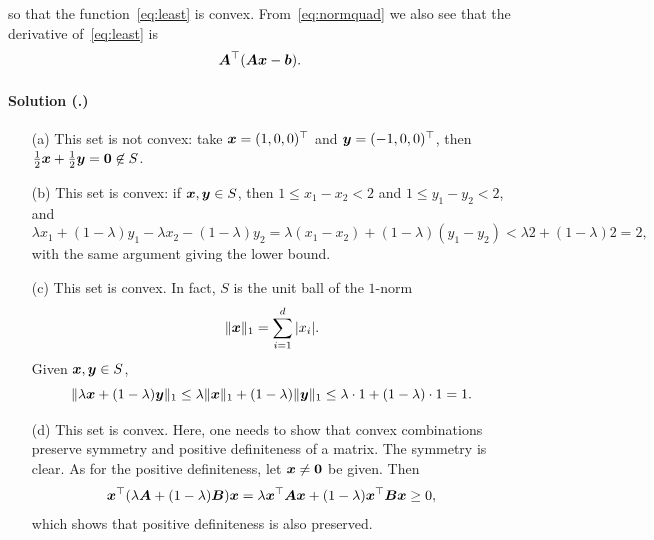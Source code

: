 \documentclass{article}
\newcounter{problemSheetNumber}
\newcounter{problems}
\renewcommand{\solution}[1]{\paragraph{Solution (\theproblemSheetNumber.\theproblems)}\addtocounter{problems}{1}\label{#1}}
\begin{document}
so that the function~\eqref{eq:least} is convex. From~\eqref{eq:normquad} we also see that the derivative of~\eqref{eq:least} is
\begin{equation*}
 \bm{A}^{\top}(\bm{A}\bm{x}-\bm{b}).
\end{equation*}

\solution{pr:1} 
\begin{itemize}
 \item[(a)] This set is not convex: take $\bm{x}=(1,0,0)^{\top}$ and $\bm{y}=(-1,0,0)^{\top}$, then $\frac{1}{2}\bm{x}+\frac{1}{2}\bm{y}=\bm{0} \not\in S$.
 \item[(b)] This set is convex: if $\bm{x},\bm{y}\in S$, then $1\leq x_1-x_2<2$ and $1\leq y_1-y_2<2$, and
 \begin{equation*}
  \lambda x_1+(1-\lambda)y_1-\lambda x_2-(1-\lambda)y_2 = \lambda (x_1-x_2)+(1-\lambda)(y_1-y_2)<\lambda 2+(1-\lambda)2 = 2,
 \end{equation*}
 with the same argument giving the lower bound. 
 \item[(c)] This set is convex. In fact, $S$ is the unit ball of the $1$-norm
 \begin{equation*}
  \Vert {\bm{x}}\Vert_1 = \sum_{i=1}^d |x_i|.
 \end{equation*}
 Given $\bm{x},\bm{y}\in S$,
 \begin{equation*}
  \Vert {\lambda \bm{x}+(1-\lambda)\bm{y}}\Vert_1 \leq \lambda \Vert {\bm{x}}\Vert_1+(1-\lambda)\Vert {\bm{y}}\Vert_1 \leq \lambda \cdot 1+(1-\lambda)\cdot 1 = 1.
 \end{equation*}
 \item[(d)] This set is convex. Here, one needs to show that convex combinations preserve symmetry and positive definiteness of a matrix. The symmetry is clear. As for the positive definiteness, let $\bm{x}\neq \bm{0}$ be given. Then
 \begin{equation*}
  \bm{x}^{\top}(\lambda \bm{A}+(1-\lambda)\bm{B})\bm{x} = \lambda \bm{x}^{\top}\bm{A}\bm{x}+(1-\lambda)\bm{x}^{\top}\bm{B}\bm{x} \geq 0,
 \end{equation*}
which shows that positive definiteness is also preserved.
\end{itemize}
\end{document}

